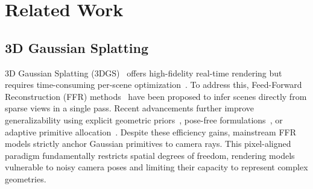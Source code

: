 \documentclass[letterpaper]{article} %
\begin{document}
\section{Related Work}


\subsection{3D Gaussian Splatting}
3D Gaussian Splatting (3DGS)~\cite{kerbl20233dgs} offers high-fidelity real-time rendering but requires time-consuming per-scene optimization~\cite{yu2024gof, chen2024pgsr}. To address this, Feed-Forward Reconstruction (FFR) methods~\cite{szymanowicz2024splatterimage, charatan2024pixelsplat, chen2024mvsplat, li2026tokensplat, xu2024freesplatter, gupta2026GenWildSplat, moreau2025offthegrid, wang2026trisplat} have been proposed to infer scenes directly from sparse views in a single pass. Recent advancements further improve generalizability using explicit geometric priors~\cite{xu2025depthsplat, jiang2025anysplat}, pose-free formulations~\cite{ye2025yonosplat, huang2025spfsplat}, or adaptive primitive allocation~\cite{wan2026splatweaver}. Despite these efficiency gains, mainstream FFR models strictly anchor Gaussian primitives to camera rays. This pixel-aligned paradigm fundamentally restricts spatial degrees of freedom, rendering models vulnerable to noisy camera poses and limiting their capacity to represent complex geometries.
\end{document}
